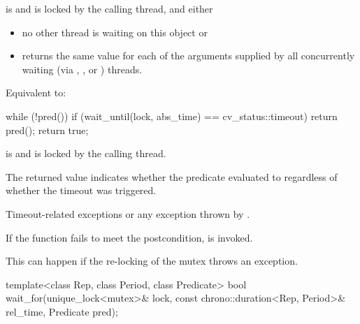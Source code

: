 \begin{itemdescr}
\pnum
\expects
{} is  and  is
locked by the calling thread, and either
\begin{itemize}
\item no other thread is waiting on this  object or
\item {} returns the same value for each of the 
arguments supplied by all concurrently waiting (via ,
, or ) threads.
\end{itemize}

\pnum
\effects
Equivalent to:
\begin{codeblock}
while (!pred())
  if (wait_until(lock, abs_time) == cv_status::timeout)
    return pred();
return true;
\end{codeblock}

\pnum
\ensures
{} is  and 
is locked by the calling thread.

\pnum
\begin{note}
The returned value indicates whether the predicate evaluated to
 regardless of whether the timeout was triggered.
\end{note}

\pnum
\throws
Timeout-related
exceptions or any exception thrown by .

\pnum
\remarks
If the function fails to meet the postcondition, 
is invoked.
\begin{note}
This can happen if the re-locking of the mutex throws an exception.
\end{note}
\end{itemdescr}

%
\begin{itemdecl}
template<class Rep, class Period, class Predicate>
  bool wait_for(unique_lock<mutex>& lock,
                const chrono::duration<Rep, Period>& rel_time,
                Predicate pred);
\end{itemdecl}

